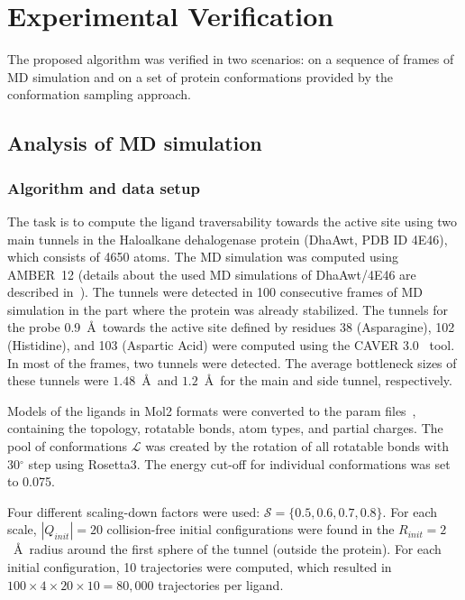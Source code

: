\documentclass[usletter, 10pt, conference]{ieeeconf} %
\def\QI{Q_{init}}
\def\RI{R_{init}}
\def\L{\mathcal{L}}
\def\S{\mathcal{S}}
\begin{document}
\section{Experimental Verification}

The proposed algorithm was verified in two scenarios: on a sequence of frames of MD simulation and on a set of protein conformations 
provided by the conformation sampling approach.

\subsection{Analysis of MD simulation}



\subsubsection{Algorithm and data setup}

The task is to compute the ligand traversability towards the active site using two main tunnels in the Haloalkane dehalogenase protein (DhaAwt, PDB ID 4E46), which consists of 4650 atoms.
The MD simulation was computed using AMBER~12 (details about the used MD simulations of DhaAwt/4E46 are described in~\cite{marques2017catalytic}).
The tunnels were detected in 100 consecutive frames of MD simulation in the part where the protein was already stabilized.
The tunnels for the probe 0.9~\AA\ towards the active site defined by residues 38 (Asparagine), 102 (Histidine), and 103 (Aspartic Acid) were
computed using the CAVER 3.0~\cite{caver3} tool.
In most of the frames, two tunnels were detected.
The average bottleneck sizes of these tunnels were $1.48$~\AA\ and $1.2$~\AA\ for the main and side tunnel, respectively.

Models  of the ligands in Mol2 formats were converted to the param files~\cite{meiler2006rosettaligand}, containing the topology, rotatable bonds, atom types, and partial charges. 
The pool of conformations $\L$ was created by the rotation of all rotatable bonds with 30$^\circ$ step using Rosetta3.
The energy cut-off for individual conformations was set to 0.075. %

Four different scaling-down factors were used: $\S=\{0.5,0.6,0.7,0.8\}$.
For each scale, $|\QI|=20$ collision-free initial configurations were found in the $\RI=2$~\AA\ radius around the first sphere of the tunnel (outside the protein).
For each initial configuration, 10 trajectories were computed, which resulted
in $100 \times 4 \times 20 \times 10 = 80,000$ trajectories per ligand.
\end{document}
